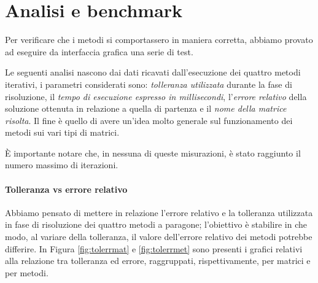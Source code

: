 \section{Analisi e benchmark}

Per verificare che i metodi si comportassero in maniera corretta, abbiamo provato ad eseguire da interfaccia grafica una serie di test.

Le seguenti analisi nascono dai dati ricavati dall'esecuzione dei quattro metodi iterativi, i parametri considerati sono: \textit{tolleranza utilizzata} durante la fase di risoluzione, il \textit{tempo di esecuzione espresso in millisecondi}, l'\textit{errore relativo} della soluzione ottenuta in relazione a quella di partenza e il \textit{nome della matrice risolta}. Il fine è quello di avere un'idea molto generale sul funzionamento dei metodi sui vari tipi di matrici.

È importante notare che, in nessuna di queste misurazioni, è stato raggiunto il numero massimo di iterazioni.


\paragraph{Tolleranza vs errore relativo}
Abbiamo pensato di mettere in relazione l'errore relativo e la tolleranza utilizzata in fase di risoluzione dei quattro metodi a paragone; l'obiettivo è stabilire in che modo, al variare della tolleranza, il valore dell'errore relativo dei metodi potrebbe differire. In Figura \ref{fig:tolerrmat} e \ref{fig:tolerrmet} sono presenti i grafici relativi alla relazione tra tolleranza ed errore, raggruppati, rispettivamente, per matrici e per metodi.



